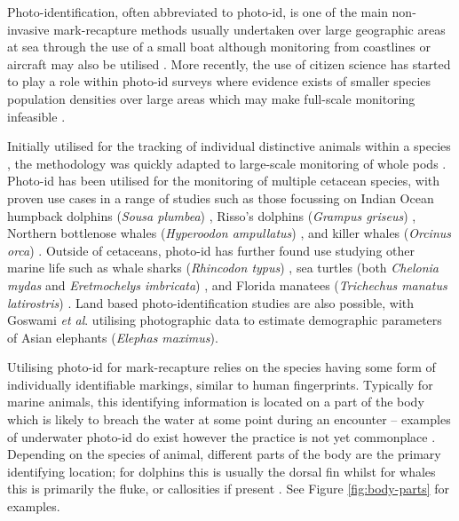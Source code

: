 Photo-identification, often abbreviated to photo-id, is one of the main non-invasive mark-recapture methods usually undertaken over large geographic areas at sea through the use of a small boat although monitoring from coastlines or aircraft may also be utilised \cite{hammond_individual_1990, evans_monitoring_2004, payne_long_1986, forney_seasonal_1998, wursig_methods_1990}. More recently, the use of citizen science has started to play a role within photo-id surveys where evidence exists of smaller species population densities over large areas which may make full-scale monitoring infeasible \cite{gibson_using_2020, cheney_integrating_2013}.

Initially utilised for the tracking of individual distinctive animals within a species \cite{caldwell_evidence_1955, schevill_daily_1960}, the methodology was quickly adapted to large-scale monitoring of whole pods \cite{alves_population_2013, franklin_migratory_2008}. Photo-id has been utilised for the monitoring of multiple cetacean species, with proven use cases in a range of studies such as those focussing on Indian Ocean humpback dolphins (\textit{Sousa plumbea}) \cite{sharpe_indian_2019}, Risso's dolphins (\textit{Grampus griseus}) \cite{miragliuolo_rissos_2004}, Northern bottlenose whales (\textit{Hyperoodon ampullatus}) \cite{feyrer_origin_2021}, and killer whales (\textit{Orcinus orca}) \cite{bigg_assessment_1982}. Outside of cetaceans, photo-id has further found use studying other marine life such as whale sharks (\textit{Rhincodon typus}) \cite{holmberg_estimating_2009}, sea turtles (both \textit{Chelonia mydas} and \textit{Eretmochelys imbricata}) \cite{reisser_photographic_2008}, and Florida manatees (\textit{Trichechus manatus latirostris}) \cite{langtimm_survival_2004}. Land based photo-identification studies are also possible, with Goswami \textit{et al}. \cite{goswami_application_2007} utilising photographic data to estimate demographic parameters of Asian elephants (\textit{Elephas maximus}).

Utilising photo-id for mark-recapture relies on the species having some form of individually identifiable markings, similar to human fingerprints. Typically for marine animals, this identifying information is located on a part of the body which is likely to breach the water at some point during an encounter -- examples of underwater photo-id do exist however the practice is not yet commonplace \cite{vanbressem_visual_2018, veronique_underwater_2022}. Depending on the species of animal, different parts of the body are the primary identifying location; for dolphins this is usually the dorsal fin whilst for whales this is primarily the fluke, or callosities if present \cite{vernazzani_eastern_2013, arnbom_individual_1987, constantine_abundance_2012, sharpe_indian_2019, baird_population_2009}. See Figure \ref{fig:body-parts} for examples.

